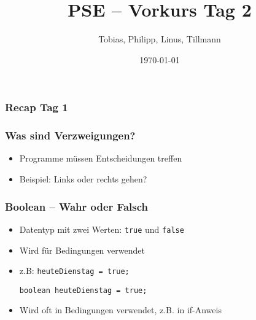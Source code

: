 \documentclass{../../presentation}
\title{PSE – Vorkurs Tag 2}
\author{Tobias, Philipp, Linus, Tillmann}
\institute{FIUS - Fachgruppe Informatik Universität Stuttgart}
\date{\today}
\begin{document}
\begin{frame}
  \titlepage
\end{frame}

\begin{frame}
  \listoftodos
\end{frame}

\begin{frame}
  \frametitle{Recap Tag 1}
\end{frame}

\begin{frame}
  \frametitle{Was sind Verzweigungen?}
  \begin{itemize}
    \item Programme müssen Entscheidungen treffen 
    \item Beispiel: Links oder rechts gehen?
  \end{itemize}
\end{frame}

\begin{frame}[fragile]
  \frametitle{Boolean – Wahr oder Falsch}
  \begin{itemize}
    \item Datentyp mit zwei Werten: \texttt{true} und \texttt{false}
    \item Wird für Bedingungen verwendet

    \item z.B: \texttt{heuteDienstag = true;}
    \begin{verbatim}
boolean heuteDienstag = true;
    \end{verbatim}
    \item<2-> Wird oft in Bedingungen verwendet, z.B. in if-Anweis
   
    
  \end{itemize}
\end{frame}
\end{document}
